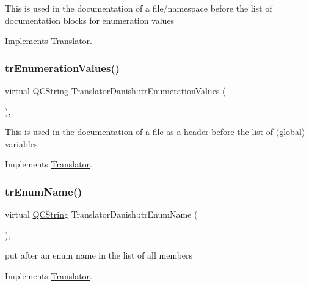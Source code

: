 This is used in the documentation of a file/namespace before the list of documentation blocks for enumeration values 

Implements \mbox{\hyperlink{class_translator}{Translator}}.

\mbox{\label{class_translator_danish_afc90bece8c05803ca2cfc639f29e827f}} 
\subsubsection{\texorpdfstring{trEnumerationValues()}{trEnumerationValues()}}
{\footnotesize\ttfamily virtual \mbox{\hyperlink{class_q_c_string}{Q\+C\+String}} Translator\+Danish\+::tr\+Enumeration\+Values (\begin{DoxyParamCaption}{ }\end{DoxyParamCaption})\hspace{0.3cm}{\ttfamily [inline]}, {\ttfamily [virtual]}}

This is used in the documentation of a file as a header before the list of (global) variables 

Implements \mbox{\hyperlink{class_translator}{Translator}}.

\mbox{\label{class_translator_danish_a67543b35aa1064141b931c21b100e683}} 
\subsubsection{\texorpdfstring{trEnumName()}{trEnumName()}}
{\footnotesize\ttfamily virtual \mbox{\hyperlink{class_q_c_string}{Q\+C\+String}} Translator\+Danish\+::tr\+Enum\+Name (\begin{DoxyParamCaption}{ }\end{DoxyParamCaption})\hspace{0.3cm}{\ttfamily [inline]}, {\ttfamily [virtual]}}

put after an enum name in the list of all members 

Implements \mbox{\hyperlink{class_translator}{Translator}}.

\mbox{\label{class_translator_danish_a932304de8980cbc82e14f3bd3886aa78}} 
